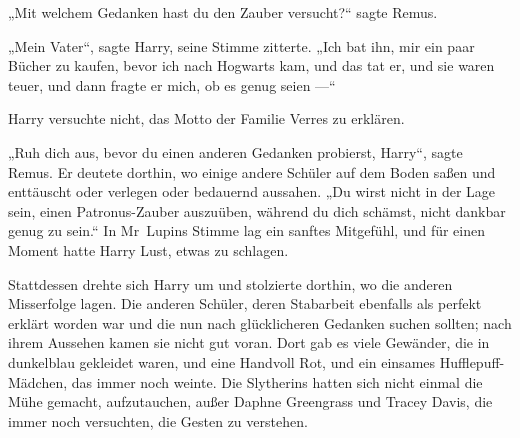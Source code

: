 „Mit welchem Gedanken hast du den Zauber versucht?“ sagte Remus.

„Mein Vater“, sagte Harry, seine Stimme zitterte.
„Ich bat ihn, mir ein paar Bücher zu kaufen, bevor ich nach Hogwarts kam, und das tat er, und sie waren teuer, und dann fragte er mich, ob es genug seien —“

Harry versuchte nicht, das Motto der Familie Verres zu erklären.

„Ruh dich aus, bevor du einen anderen Gedanken probierst, Harry“, sagte Remus. Er deutete dorthin, wo einige andere Schüler auf dem Boden saßen und enttäuscht oder verlegen oder bedauernd aussahen.
„Du wirst nicht in der Lage sein, einen Patronus-Zauber auszuüben, während du dich schämst, nicht dankbar genug zu sein.“ In Mr~Lupins Stimme lag ein sanftes Mitgefühl, und für einen Moment hatte Harry Lust, etwas zu schlagen.

Stattdessen drehte sich Harry um und stolzierte dorthin, wo die anderen Misserfolge lagen. Die anderen Schüler, deren Stabarbeit ebenfalls als perfekt erklärt worden war und die nun nach glücklicheren Gedanken suchen sollten; nach ihrem Aussehen kamen sie nicht gut voran. Dort gab es viele Gewänder, die in dunkelblau gekleidet waren, und eine Handvoll Rot, und ein einsames Hufflepuff-Mädchen, das immer noch weinte. Die Slytherins hatten sich nicht einmal die Mühe gemacht, aufzutauchen, außer Daphne Greengrass und Tracey Davis, die immer noch versuchten, die Gesten zu verstehen.

